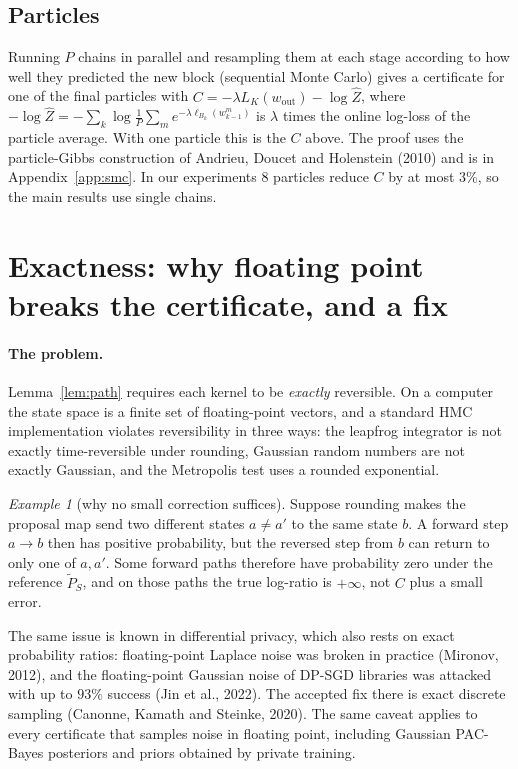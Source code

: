 \documentclass[11pt]{article}
\theoremstyle{definition}
\theoremstyle{remark}
\newtheorem{example}[theorem]{Example}
\newcommand{\Pt}{\widetilde{P}}
\begin{document}
\subsection{Particles}\label{sec:smc}
Running $P$ chains in parallel and resampling them at each stage according to how well they predicted the new block
(sequential Monte Carlo) gives a certificate for one of the final particles with $C=-\lambda L_K(w_{\text{out}})-\log\hat Z$,
where $-\log\hat Z=-\sum_k\log\frac1P\sum_m e^{-\lambda\ell_{B_k}(w^{m}_{k-1})}$ is $\lambda$ times the online log-loss of
the particle average. With one particle this is the $C$ above. The proof uses the particle-Gibbs construction of Andrieu,
Doucet and Holenstein (2010) and is in Appendix~\ref{app:smc}. In our experiments $8$ particles reduce $C$ by at most
$3\%$, so the main results use single chains.

\section{Exactness: why floating point breaks the certificate, and a fix}\label{sec:exact}

\paragraph{The problem.} Lemma~\ref{lem:path} requires each kernel to be \emph{exactly} reversible. On a computer the
state space is a finite set of floating-point vectors, and a standard HMC implementation violates reversibility in three
ways: the leapfrog integrator is not exactly time-reversible under rounding, Gaussian random numbers are not exactly
Gaussian, and the Metropolis test uses a rounded exponential.

\begin{example}[why no small correction suffices]
Suppose rounding makes the proposal map send two different states $a\neq a'$ to the same state $b$. A forward step
$a\to b$ then has positive probability, but the reversed step from $b$ can return to only one of $a,a'$. Some forward
paths therefore have probability zero under the reference $\Pt_S$, and on those paths the true log-ratio is $+\infty$,
not $C$ plus a small error.
\end{example}

The same issue is known in differential privacy, which also rests on exact probability ratios: floating-point Laplace
noise was broken in practice (Mironov, 2012), and the floating-point Gaussian noise of DP-SGD libraries was attacked with
up to $93\%$ success (Jin et al., 2022). The accepted fix there is exact discrete sampling (Canonne, Kamath and Steinke,
2020). The same caveat applies to every certificate that samples noise in floating point, including Gaussian PAC-Bayes
posteriors and priors obtained by private training.
\end{document}
